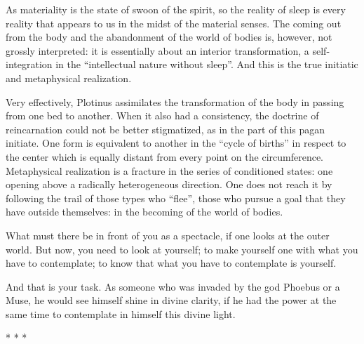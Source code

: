 As materiality is the state of swoon of the spirit, so the reality of sleep is every reality that appears to us in the midst of the material senses. The coming out from the body and the abandonment of the world of bodies is, however, not grossly interpreted: it is essentially about an interior transformation, a self-integration in the ``intellectual nature without sleep''. And this is the true initiatic and metaphysical realization.

Very effectively, Plotinus assimilates the transformation of the body in passing from one bed to another. When it also had a consistency, the doctrine of reincarnation could not be better stigmatized, as in the part of this pagan initiate. One form is equivalent to another in the ``cycle of births'' in respect to the center which is equally distant from every point on the circumference. Metaphysical realization is a fracture in the series of conditioned states: one opening above a radically heterogeneous direction. One does not reach it by following the trail of those types who ``flee'', those who pursue a goal that they have outside themselves: in the becoming of the world of bodies.

\begin{quotex}
What must there be in front of you as a spectacle, if one looks at the outer world. But now, you need to look at yourself; to make yourself one with what you have to contemplate; to know that what you have to contemplate is yourself.

And that is your task. As someone who was invaded by the god Phoebus or a Muse, he would see himself shine in divine clarity, if he had the power at the same time to contemplate in himself this divine light.
\end{quotex}




\begin{center}* * *\end{center}

